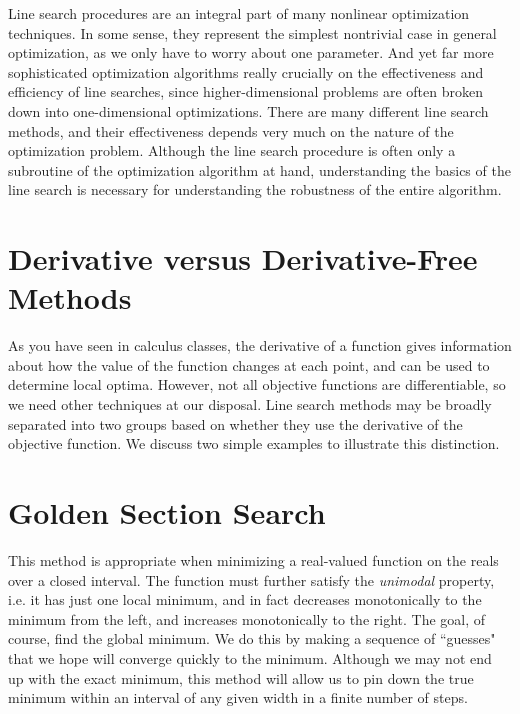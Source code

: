 
Line search procedures are an integral part of many nonlinear optimization techniques. In some sense, they represent the simplest nontrivial case in general optimization, as we only have to worry about one parameter. And yet far more sophisticated optimization algorithms really crucially on the effectiveness and efficiency of line searches, since higher-dimensional problems are often broken down into one-dimensional optimizations. There are many different line search methods, and their effectiveness depends very much on the nature of the optimization problem. Although the line search procedure is often only a subroutine of the optimization algorithm at hand, understanding the basics of the line search is necessary for understanding the robustness of the entire algorithm.

\section*{Derivative versus Derivative-Free Methods}
As you have seen in calculus classes, the derivative of a function gives information about how the value of the function changes at each point, and can be used to determine local optima. However, not all objective functions are differentiable, so we need other techniques at our disposal. Line search methods may be broadly separated into two groups based on whether they use the derivative of the objective function. We discuss two simple examples to illustrate this distinction.

\section{Golden Section Search}
This method is appropriate when minimizing a real-valued function on the reals over a closed interval. The function must further satisfy the \emph{unimodal} property, i.e. it has just one local minimum, and in fact decreases monotonically to the minimum from the left, and increases monotonically to the right. The goal, of course, find the global minimum. We do this by making a sequence of ``guesses" that we hope will converge quickly to the minimum. Although we may not end up with the exact minimum, this method will allow us to pin down the true minimum within an interval of any given width in a finite number of steps.

